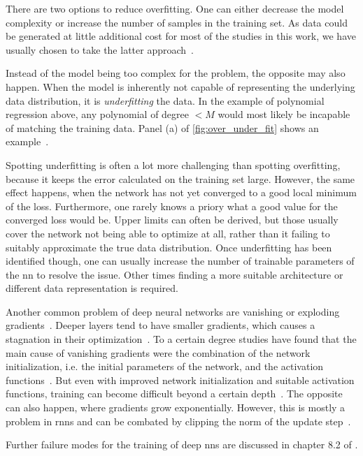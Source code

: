 There are two options to reduce overfitting. One can either decrease the model complexity or increase the number of samples in the training set. As data could be generated at little additional cost for most of the studies in this work, we have usually chosen to take the latter approach~\cite{Goodfellow:2016:DNN, Geron:2017aaa}.

Instead of the model being too complex for the problem, the opposite may also happen. When the model is inherently not capable of representing the underlying data distribution, it is \emph{underfitting} the data. In the example of polynomial regression above, any polynomial of degree $<M$ would most likely be incapable of matching the training data. Panel (a) of \autoref{fig:over_under_fit} shows an example~\cite{Goodfellow:2016:DNN}.

Spotting underfitting is often a lot more challenging than spotting overfitting, because it keeps the error calculated on the training set large. However, the same effect happens, when the network has not yet converged to a good local minimum of the loss. Furthermore, one rarely knows a priory what a good value for the converged loss would be. Upper limits can often be derived, but those usually cover the network not being able to optimize at all, rather than it failing to suitably approximate the true data distribution. Once underfitting has been identified though, one can usually increase the number of trainable parameters of the \acrshort{nn} to resolve the issue. Other times finding a more suitable architecture or different data representation is required.

Another common problem of deep neural networks are vanishing or exploding gradients~\cite{Goodfellow:2016:DNN,Geron:2017aaa,He:2015aaa}. Deeper layers tend to have smaller gradients, which causes a stagnation in their optimization~\cite{Geron:2017aaa}. %
To a certain degree studies have found that the main cause of vanishing gradients were the combination of the network initialization, i.e. the initial parameters of the network, and the activation functions~\cite{Glorot:2010aaa}. But even with improved network initialization and suitable activation functions, training can become difficult beyond a certain depth~\cite{He:2015aaa}.
The opposite can also happen, where gradients grow exponentially. However, this is mostly a problem in \acrshort{rnn}s and can be combated by clipping the norm of the update step~\cite{Goodfellow:2016:DNN}. %


Further failure modes for the training of deep \acrshort{nn}s are discussed in chapter 8.2 of \cite{Goodfellow:2016:DNN}.


